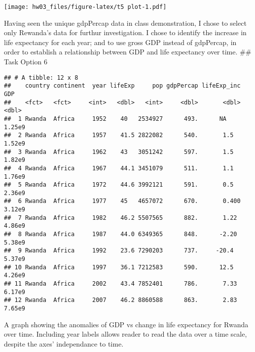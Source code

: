 \documentclass[]{article}
\newenvironment{Shaded}{\begin{snugshade}}{\end{snugshade}}
\newcommand{\DataTypeTok}[1]{\textcolor[rgb]{0.13,0.29,0.53}{#1}}
\newcommand{\KeywordTok}[1]{\textcolor[rgb]{0.13,0.29,0.53}{\textbf{#1}}}
\newcommand{\NormalTok}[1]{#1}
\newcommand{\OperatorTok}[1]{\textcolor[rgb]{0.81,0.36,0.00}{\textbf{#1}}}
\newcommand{\StringTok}[1]{\textcolor[rgb]{0.31,0.60,0.02}{#1}}
\begin{document}
\texttt{[image: hw03\_files/figure-latex/t5 plot-1.pdf]}

Having seen the unique gdpPercap data in class demonstration, I chose to
select only Rewanda's data for furthur investigation. I chose to
identify the increase in life expectancy for each year; and to use gross
GDP instead of gdpPercap, in order to establish a relationship between
GDP and life expectancy over time. \#\# Task Option 6

\begin{Shaded}
\end{Shaded}

\begin{verbatim}
## # A tibble: 12 x 8
##    country continent  year lifeExp     pop gdpPercap lifeExp_inc        GDP
##    <fct>   <fct>     <int>   <dbl>   <int>     <dbl>       <dbl>      <dbl>
##  1 Rwanda  Africa     1952    40   2534927      493.      NA         1.25e9
##  2 Rwanda  Africa     1957    41.5 2822082      540.       1.5       1.52e9
##  3 Rwanda  Africa     1962    43   3051242      597.       1.5       1.82e9
##  4 Rwanda  Africa     1967    44.1 3451079      511.       1.1       1.76e9
##  5 Rwanda  Africa     1972    44.6 3992121      591.       0.5       2.36e9
##  6 Rwanda  Africa     1977    45   4657072      670.       0.400     3.12e9
##  7 Rwanda  Africa     1982    46.2 5507565      882.       1.22      4.86e9
##  8 Rwanda  Africa     1987    44.0 6349365      848.      -2.20      5.38e9
##  9 Rwanda  Africa     1992    23.6 7290203      737.     -20.4       5.37e9
## 10 Rwanda  Africa     1997    36.1 7212583      590.      12.5       4.26e9
## 11 Rwanda  Africa     2002    43.4 7852401      786.       7.33      6.17e9
## 12 Rwanda  Africa     2007    46.2 8860588      863.       2.83      7.65e9
\end{verbatim}

A graph showing the anomalies of GDP vs change in life expectancy for
Rwanda over time. Including year labels allows reader to read the data
over a time scale, despite the axes' independance to time.
\end{document}
